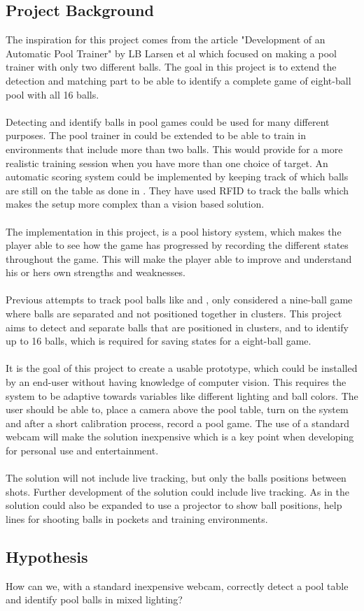 \subsection{Project Background}
The inspiration for this project comes from the article "Development of an Automatic Pool Trainer"\cite{larsbopool} by LB Larsen et al which focused on making a pool trainer with only two different balls. The goal in this project is to extend the detection and matching part to be able to identify a complete game of eight-ball pool with all 16 balls.
\\\\
Detecting and identify balls in pool games could be used for many different purposes. The pool trainer in \cite{larsbopool} could be extended to be able to train in environments that include more than two balls. This would provide for a more realistic training session when you have more than one choice of target. An automatic scoring system could be implemented by keeping track of which balls are still on the table as done in \cite{autoscore}. They have used RFID to track the balls which makes the setup more complex than a vision based solution.
\\\\
The implementation in this project, is a pool history system, which makes the player able to see how the game has progressed by recording the different states throughout the game. This will make the player able to improve and understand his or hers own strengths and weaknesses.
\\\\
Previous attempts to track pool balls like \cite{supportBilliard} and \cite{ARPool}, only considered a nine-ball game where balls are separated and not positioned together in clusters. This project aims to detect and separate balls that are positioned in clusters, and to identify up to 16 balls, which is required for saving states for a eight-ball game.
\\\\
It is the goal of this project to create a usable prototype, which could be installed by an end-user without having knowledge of computer vision. This requires the system to be adaptive towards variables like different lighting and ball colors. The user should be able to, place a camera above the pool table, turn on the system and after a short calibration process, record a pool game. The use of a standard webcam will make the solution inexpensive which is a key point when developing for personal use and entertainment.
\\\\
The solution will not include live tracking, but only the balls positions between shots. Further development of the solution could include live tracking. As in \cite{larsbopool} the solution could also be expanded to use a projector to show ball positions, help lines for shooting balls in pockets and training environments. 

\subsection{Hypothesis}
How can we, with a standard inexpensive webcam, correctly detect a pool table and identify pool balls in mixed lighting?